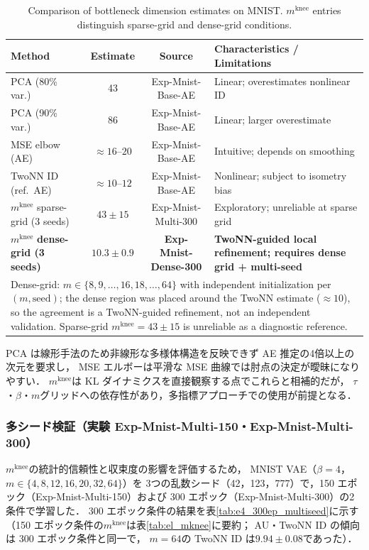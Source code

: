 \documentclass[11pt,a4paper]{jsarticle}
\newcommand{\mknee}{m^{\mathrm{knee}}}
\begin{document}
\begin{table}[H]
\centering
\caption{Comparison of bottleneck dimension estimates on MNIST. $\mknee$ entries distinguish sparse-grid and dense-grid conditions.}
\label{tab:method_comparison}
\small
\begin{tabular}{p{4.0cm}cc p{4.5cm}}
\toprule
Method & Estimate & Source & Characteristics / Limitations \\
\midrule
PCA (80\% var.) & 43 & Exp-Mnist-Base-AE & Linear; overestimates nonlinear ID \\
PCA (90\% var.) & 86 & Exp-Mnist-Base-AE & Linear; larger overestimate \\
MSE elbow (AE) & $\approx16$--$20$ & Exp-Mnist-Base-AE & Intuitive; depends on smoothing \\
TwoNN ID (ref.\ AE) & $\approx10$--$12$ & Exp-Mnist-Base-AE & Nonlinear; subject to isometry bias \\
\midrule
$\mknee$ sparse-grid (3 seeds) & $43\pm15$ & Exp-Mnist-Multi-300 & Exploratory; unreliable at sparse grid \\
$\mknee$ \textbf{dense-grid (3 seeds)} & $\boldsymbol{10.3\pm0.9}$ & \textbf{Exp-Mnist-Dense-300} & \textbf{TwoNN-guided local refinement; requires dense grid + multi-seed} \\
\midrule
\multicolumn{4}{p{13.5cm}}{\footnotesize Dense-grid: $m\in\{8,9,\ldots,16,18,\ldots,64\}$ with independent initialization per $(m,\mathrm{seed})$; the dense region was placed around the TwoNN estimate ($\approx10$), so the agreement is a TwoNN-guided refinement, not an independent validation. Sparse-grid $\mknee=43\pm15$ is unreliable as a diagnostic reference.} \\
\bottomrule
\end{tabular}
\end{table}

PCA は線形手法のため非線形な多様体構造を反映できず AE 推定の4倍以上の次元を要求し，
MSE エルボーは平滑な MSE 曲線では肘点の決定が曖昧になりやすい．
$\mknee$は KL ダイナミクスを直接観察する点でこれらと相補的だが，
$\tau$・$\beta$・$m$グリッドへの依存性があり，多指標アプローチでの使用が前提となる．

\subsubsection{多シード検証（実験 Exp-Mnist-Multi-150・Exp-Mnist-Multi-300）}\label{sec:exp_multiseed}
\label{sec:exp_multiseed2}

$\mknee$の統計的信頼性と収束度の影響を評価するため，
MNIST VAE（$\beta = 4$，$m \in \{4,8,12,16,20,32,64\}$）を
3つの乱数シード（42，123，777）で，150 エポック（Exp-Mnist-Multi-150）および
300 エポック（Exp-Mnist-Multi-300）の2条件で学習した．
300 エポック条件の結果を表\ref{tab:e4_300ep_multiseed}に示す
（150 エポック条件の$\mknee$は表\ref{tab:el_mknee}に要約；
AU・TwoNN ID の傾向は 300 エポック条件と同一で，
$m=64$の TwoNN ID は$9.94 \pm 0.08$であった）．
\end{document}
